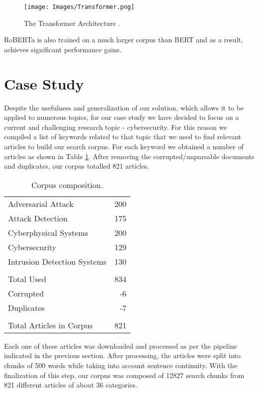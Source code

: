 \documentclass[runningheads]{llncs}
\begin{document}
\begin{figure}[H]
\centering
\texttt{[image: Images/Transformer.png]}
\caption{The Transformer Architecture \cite{vaswani2017attention}.}
\label{fig:transformer}
\end{figure}

RoBERTa is also trained on a much larger corpus than BERT and as a result, achieves significant performance gains. \

\section{Case Study}
\label{section:case-study}

Despite the usefulness and generalization of our solution, which allows it to be applied to numerous topics, for our case study we have decided to focus on a current and challenging research topic - cybersecurity.
For this reason we compiled a list of keywords related to that topic that we used to find relevant articles to build our search corpus. For each keyword we obtained a number of articles as shown in Table \ref{tab:corpus}. After removing the corrupted/unparsable documents and duplicates, our corpus totalled 821 articles.
	 
\begin{table}[H]
\caption{Corpus composition.}
\centering
\footnotesize
\begin{tabular}{lr}
\midrule
Adversarial Attack          & 200   \\
Attack Detection            & 175   \\
Cyberphysical Systems       & 200   \\
Cybersecurity               & 129   \\
Intrusion Detection Systems & 130   \\
                                    \\
Total Used                  & 834   \\
Corrupted                   & -6    \\
Duplicates                  & -7    \\
                                    \\
Total Articles in Corpus    & 821   \\
\bottomrule
\end{tabular}
\label{tab:corpus}
\end{table}
	 
Each one of these articles was downloaded and processed as per the pipeline indicated in the previous section. After processing, the articles were split into chunks of 500 words while taking into account sentence continuity.
With the finalization of this step, our corpus was composed of 12827 search chunks from 821 different articles of about 36 categories.
\end{document}
